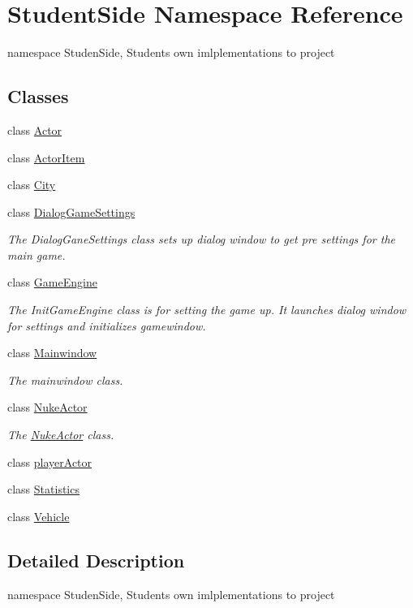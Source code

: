 \hypertarget{namespace_student_side}{\section{Student\-Side Namespace Reference}
\label{namespace_student_side}
}


namespace Studen\-Side, Students own imlplementations to project  


\subsection*{Classes}
\begin{DoxyCompactItemize}
\item 
class \hyperlink{class_student_side_1_1_actor}{Actor}
\item 
class \hyperlink{class_student_side_1_1_actor_item}{Actor\-Item}
\item 
class \hyperlink{class_student_side_1_1_city}{City}
\item 
class \hyperlink{class_student_side_1_1_dialog_game_settings}{Dialog\-Game\-Settings}
\begin{DoxyCompactList}\small\item\em The Dialog\-Gane\-Settings class sets up dialog window to get pre settings for the main game. \end{DoxyCompactList}\item 
class \hyperlink{class_student_side_1_1_game_engine}{Game\-Engine}
\begin{DoxyCompactList}\small\item\em The Init\-Game\-Engine class is for setting the game up. It launches dialog window for settings and initializes gamewindow. \end{DoxyCompactList}\item 
class \hyperlink{class_student_side_1_1_mainwindow}{Mainwindow}
\begin{DoxyCompactList}\small\item\em The mainwindow class. \end{DoxyCompactList}\item 
class \hyperlink{class_student_side_1_1_nuke_actor}{Nuke\-Actor}
\begin{DoxyCompactList}\small\item\em The \hyperlink{class_student_side_1_1_nuke_actor}{Nuke\-Actor} class. \end{DoxyCompactList}\item 
class \hyperlink{class_student_side_1_1player_actor}{player\-Actor}
\item 
class \hyperlink{class_student_side_1_1_statistics}{Statistics}
\item 
class \hyperlink{class_student_side_1_1_vehicle}{Vehicle}
\end{DoxyCompactItemize}


\subsection{Detailed Description}
namespace Studen\-Side, Students own imlplementations to project 